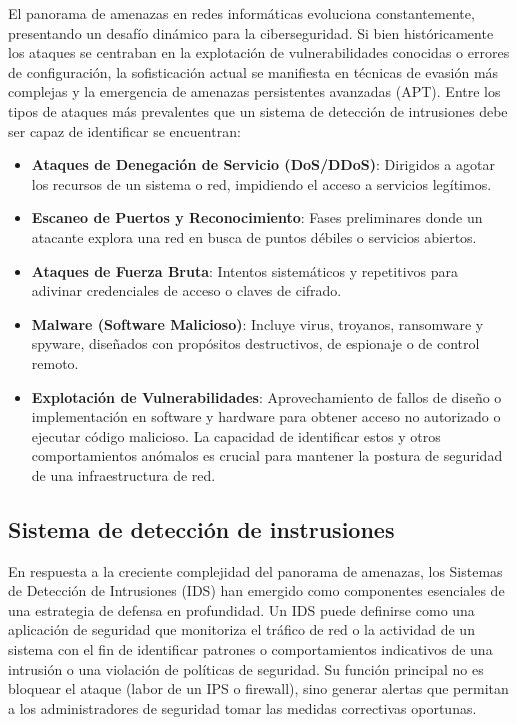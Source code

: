 El panorama de amenazas en redes informáticas evoluciona constantemente, presentando un desafío dinámico para la ciberseguridad. Si bien históricamente los ataques se centraban en la explotación de vulnerabilidades conocidas o errores de configuración, la sofisticación actual se manifiesta en técnicas de evasión más complejas y la emergencia de amenazas persistentes avanzadas (APT). Entre los tipos de ataques más prevalentes que un sistema de detección de intrusiones debe ser capaz de identificar se encuentran:
\begin{itemize}

    \item\textbf{Ataques de Denegación de Servicio (DoS/DDoS)}: Dirigidos a agotar los recursos de un sistema o red, impidiendo el acceso a servicios legítimos.
    
    \item\textbf{Escaneo de Puertos y Reconocimiento}: Fases preliminares donde un atacante explora una red en busca de puntos débiles o servicios abiertos.
    
    \item\textbf{Ataques de Fuerza Bruta}: Intentos sistemáticos y repetitivos para adivinar credenciales de acceso o claves de cifrado.
    
    \item\textbf{Malware (Software Malicioso)}: Incluye virus, troyanos, ransomware y spyware, diseñados con propósitos destructivos, de espionaje o de control remoto.
    
    \item\textbf{Explotación de Vulnerabilidades}: Aprovechamiento de fallos de diseño o implementación en software y hardware para obtener acceso no autorizado o ejecutar código malicioso.
    La capacidad de identificar estos y otros comportamientos anómalos es crucial para mantener la postura de seguridad de una infraestructura de red.

\end{itemize}

\subsection{Sistema de detección de instrusiones}\label{Sec.Capitulos}

En respuesta a la creciente complejidad del panorama de amenazas, los Sistemas de Detección de Intrusiones (IDS) han emergido como componentes esenciales de una estrategia de defensa en profundidad. Un IDS puede definirse como una aplicación de seguridad que monitoriza el tráfico de red o la actividad de un sistema con el fin de identificar patrones o comportamientos indicativos de una intrusión o una violación de políticas de seguridad. Su función principal no es bloquear el ataque (labor de un IPS o firewall), sino generar alertas que permitan a los administradores de seguridad tomar las medidas correctivas oportunas.


